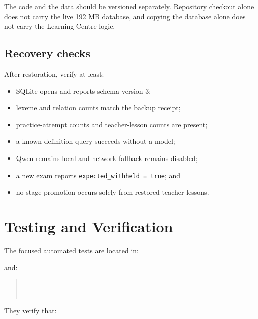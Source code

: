 \documentclass[11pt,a4paper]{article}
\begin{document}
The code and the data should be versioned separately. Repository checkout alone does not carry
the live 192 MB database, and copying the database alone does not carry the Learning Centre
logic.

\subsection{Recovery checks}

After restoration, verify at least:

\begin{itemize}
  \item SQLite opens and reports schema version 3;
  \item lexeme and relation counts match the backup receipt;
  \item practice-attempt counts and teacher-lesson counts are present;
  \item a known definition query succeeds without a model;
  \item Qwen remains local and network fallback remains disabled;
  \item a new exam reports \texttt{expected\_withheld = true}; and
  \item no stage promotion occurs solely from restored teacher lessons.
\end{itemize}

\section{Testing and Verification}

The focused automated tests are located in:

\begin{quote}
\end{quote}

and:

\begin{quote}
\\
\\
\end{quote}

They verify that:
\end{document}
